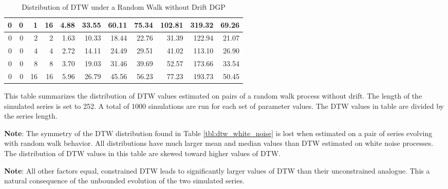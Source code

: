 \documentclass[12pt]{report}
\begin{document}
\begin{table}[!ht]
\begin{center}
\begin{tabular}{r r r r | r r r r r r r}
        0 & 0 & 1  & 16 & 4.88 & 33.55 & 60.11 & 75.34 & 102.81 & 319.32 & 69.26  \\
        \midrule
        0 & 0 & 2  & 2  & 1.63 & 10.33 & 18.44 & 22.76 &  31.39 & 122.94 & 21.07  \\
        0 & 0 & 4  & 4  & 2.72 & 14.11 & 24.49 & 29.51 &  41.02 & 113.10 & 26.90  \\
        0 & 0 & 8  & 8  & 3.70 & 19.03 & 31.46 & 39.69 &  52.57 & 173.66 & 33.54  \\
        0 & 0 & 16 & 16 & 5.96 & 26.79 & 45.56 & 56.23 &  77.23 & 193.73 & 50.45  \\
        \hline
      \end{tabular}
    \caption{Distribution of DTW under a Random Walk without Drift DGP} \label{tbl:dtw_random_walk_no_drift}
    \end{center}
    \begin{tablenotes}
        \item{\footnotesize This table summarizes the distribution of DTW values estimated on pairs of a random walk process without drift. The length of the simulated series is set to 252. A total of 1000 simulations are run for each set of parameter values. The DTW values in table are divided by the series length.}
        \item{\footnotesize \textbf{Note}: The symmetry of the DTW distribution found in Table \ref{tbl:dtw_white_noise} is lost when estimated on a pair of series evolving with random walk behavior. All distributions have much larger mean and median values than DTW estimated on white noise processes. The distribution of DTW values in this table are skewed toward higher values of DTW.}
        \item{\footnotesize \textbf{Note}: All other factors equal, constrained DTW leads to significantly larger values of DTW than their unconstrained analogue. This a natural consequence of the unbounded evolution of the two simulated series.}
    \end{tablenotes}
\end{table}
\end{document}
